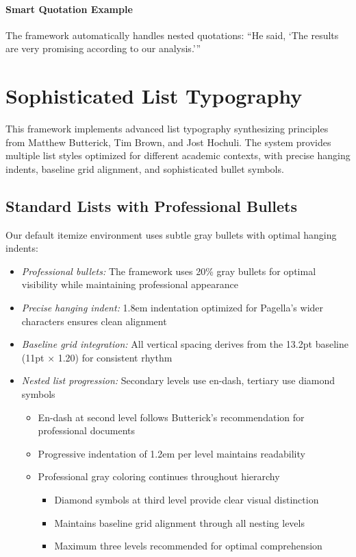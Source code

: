 \documentclass[11pt]{article}
\begin{document}
\paragraph{Smart Quotation Example} The framework automatically handles nested quotations: \enquote{He said, \enquote{The results are very promising according to our analysis.}}

\clearpage

\section{Sophisticated List Typography}

This framework implements advanced list typography synthesizing principles from Matthew Butterick, Tim Brown, and Jost Hochuli. The system provides multiple list styles optimized for different academic contexts, with precise hanging indents, baseline grid alignment, and sophisticated bullet symbols.

\subsection{Standard Lists with Professional Bullets}

Our default itemize environment uses subtle gray bullets with optimal hanging indents:

\begin{itemize}
\item \emph{Professional bullets:} The framework uses 20\% gray bullets for optimal visibility while maintaining professional appearance
\item \emph{Precise hanging indent:} 1.8em indentation optimized for Pagella's wider characters ensures clean alignment
\item \emph{Baseline grid integration:} All vertical spacing derives from the 13.2pt baseline (11pt × 1.20) for consistent rhythm
\item \emph{Nested list progression:} Secondary levels use en-dash, tertiary use diamond symbols
  \begin{itemize}
  \item En-dash at second level follows Butterick's recommendation for professional documents
  \item Progressive indentation of 1.2em per level maintains readability
  \item Professional gray coloring continues throughout hierarchy
    \begin{itemize}
    \item Diamond symbols at third level provide clear visual distinction
    \item Maintains baseline grid alignment through all nesting levels
    \item Maximum three levels recommended for optimal comprehension
    \end{itemize}
  \end{itemize}
\end{itemize}
\end{document}
